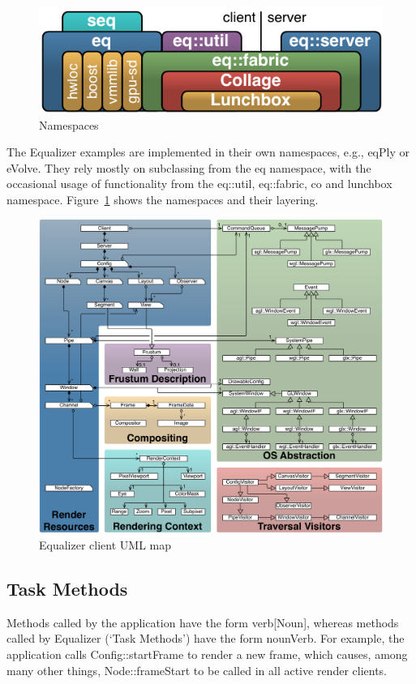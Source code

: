 \documentclass[10pt,a4]{scrartcl}
\newcommand{\fig}[1]{Figure~\ref{#1}}
\begin{document}
\begin{figure}
  \includegraphics[width=.618\textwidth]{images/namespaces}
  {\caption{\label{fNamespaces}Namespaces}}
\end{figure}
The Equalizer examples are implemented in their own namespaces, e.g.,
\textsf{eqPly} or \textsf{eVolve}. They rely mostly on subclassing from the
\textsf{eq} namespace, with the occasional usage of functionality from the
\textsf{eq::util}, \textsf{eq::fabric}, \textsf{co} and \textsf{lunchbox}
namespace. \fig{fNamespaces} shows the namespaces and their layering.

\begin{figure}[ht!]\center
  \includegraphics[width=\textwidth]{images/clientUML}
  {\caption{\label{fClientUml}Equalizer client UML map}}
\end{figure}

\subsection{\label{sTaskMethods}Task Methods}

Methods called by the application have the form \textsf{verb[Noun]},
whereas methods called by Equalizer (`Task Methods') have the form
\textsf{nounVerb}. For example, the application calls
\textsf{Config::startFrame} to render a new frame, which causes, among
many other things, \textsf{Node::frameStart} to be called in all active
render clients.
\end{document}
